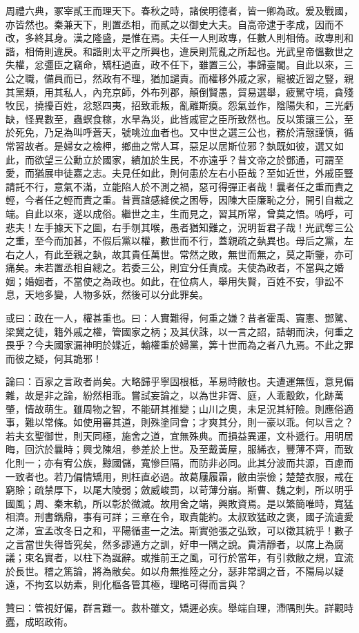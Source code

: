 \begin{pinyinscope}
周禮六典，冢宰貳王而理天下。春秋之時，諸侯明德者，皆一卿為政。爰及戰國，亦皆然也。秦兼天下，則置丞相，而貳之以御史大夫。自高帝逮于孝成，因而不改，多終其身。漢之隆盛，是惟在焉。夫任一人則政專，任數人則相倚。政專則和諧，相倚則違戾。和諧則太平之所興也，違戾則荒亂之所起也。光武皇帝慍數世之失權，忿彊臣之竊命，矯枉過直，政不任下，雖置三公，事歸臺閣。自此以來，三公之職，備員而已，然政有不理，猶加譴責。而權移外戚之家，寵被近習之豎，親其黨類，用其私人，內充京師，外布列郡，顛倒賢愚，貿易選舉，疲駑守境，貪殘牧民，撓擾百姓，忿怒四夷，招致乖叛，亂離斯瘼。怨氣並作，陰陽失和，三光虧缺，怪異數至，蟲螟食稼，水旱為災，此皆戚宦之臣所致然也。反以策讓三公，至於死免，乃足為叫呼蒼天，號咷泣血者也。又中世之選三公也，務於清愨謹慎，循常習故者。是婦女之檢柙，鄉曲之常人耳，惡足以居斯位邪？埶既如彼，選又如此，而欲望三公勳立於國家，績加於生民，不亦遠乎？昔文帝之於鄧通，可謂至愛，而猶展申徒嘉之志。夫見任如此，則何患於左右小臣哉？至如近世，外戚臣豎請託不行，意氣不滿，立能陷人於不測之禍，惡可得彈正者哉！曩者任之重而責之輕，今者任之輕而責之重。昔賈誼感絳侯之困辱，因陳大臣廉恥之分，開引自裁之端。自此以來，遂以成俗。繼世之主，生而見之，習其所常，曾莫之悟。嗚呼，可悲夫！左手據天下之圖，右手刎其喉，愚者猶知難之，況明哲君子哉！光武奪三公之重，至今而加甚，不假后黨以權，數世而不行，蓋親疏之埶異也。母后之黨，左右之人，有此至親之埶，故其貴任萬世。常然之敗，無世而無之，莫之斯鑒，亦可痛矣。未若置丞相自總之。若委三公，則宜分任責成。夫使為政者，不當與之婚姻；婚姻者，不當使之為政也。如此，在位病人，舉用失賢，百姓不安，爭訟不息，天地多變，人物多妖，然後可以分此罪矣。

或曰：政在一人，權甚重也。曰：人實難得，何重之嫌？昔者霍禹、竇憲、鄧騭、梁冀之徒，籍外戚之權，管國家之柄；及其伏誅，以一言之詔，詰朝而決，何重之畏乎？今夫國家漏神明於媟近，輸權重於婦黨，筭十世而為之者八九焉。不此之罪而彼之疑，何其詭邪！

論曰：百家之言政者尚矣。大略歸乎寧固根柢，革易時敝也。夫遭運無恆，意見偏雜，故是非之論，紛然相乖。嘗試妄論之，以為世非胥、庭，人乖鷇飲，化跡萬肇，情故萌生。雖周物之智，不能研其推變；山川之奧，未足況其紆險。則應俗適事，難以常條。如使用審其道，則殊塗同會；才爽其分，則一豪以乖。何以言之？若夫玄聖御世，則天同極，施舍之道，宜無殊典。而損益異運，文朴遞行。用明居晦，回泬於曩時；興戈陳俎，參差於上世。及至戴黃屋，服絺衣，豐薄不齊，而致化則一；亦有宥公族，黥國儲，寬慘巨隔，而防非必同。此其分波而共源，百慮而一致者也。若乃偏情矯用，則枉直必過。故葛屨履霜，敝由崇儉；楚楚衣服，戒在窮賒；疏禁厚下，以尾大陵弱；斂威峻罰，以苛薄分崩。斯曹、魏之刺，所以明乎國風；周、秦末軌，所以彰於微滅。故用舍之端，興敗資焉。是以繁簡唯時，寬猛相濟。刑書鐫鼎，事有可詳；三章在令，取貴能約。太叔致猛政之褒，國子流遺愛之涕，宣孟改冬日之和，平陽循畫一之法。斯實弛張之弘致，可以徵其統乎！數子之言當世失得皆究矣，然多謬通方之訓，好申一隅之說。貴清靜者，以席上為腐議；束名實者，以柱下為誕辭。或推前王之風，可行於當年，有引救敝之規，宜流於長世。稽之篤論，將為敝矣。如以舟無推陸之分，瑟非常調之音，不陽局以疑遠，不拘玄以妨素，則化樞各管其極，理略可得而言與？

贊曰：管視好偏，群言難一。救朴雖文，矯遲必疾。舉端自理，滯隅則失。詳觀時蠹，成昭政術。


\end{pinyinscope}